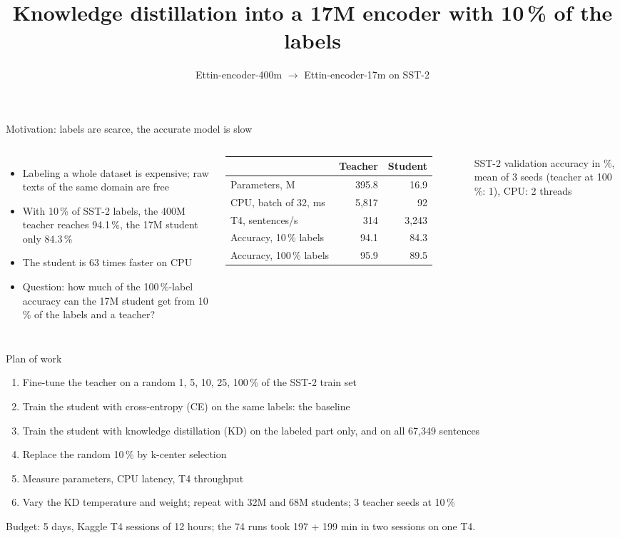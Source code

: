 \documentclass[aspectratio=169,11pt]{beamer}
\title{Knowledge distillation into a 17M encoder with 10\,\% of the labels}
\subtitle{Ettin-encoder-400m $\to$ Ettin-encoder-17m on SST-2}
\institute{Group project, Efficient Models course, ITMO 2026}
\date{}
\begin{document}
\begin{frame}
  \titlepage
\end{frame}

\begin{frame}{Motivation: labels are scarce, the accurate model is slow}
  \begin{columns}[T]
    \begin{itemize}
      \item Labeling a whole dataset is expensive; raw texts of the same domain are free
      \item With 10\,\% of SST-2 labels, the 400M teacher reaches 94.1\,\%, the 17M student only 84.3\,\%
      \item The student is 63 times faster on CPU
      \item Question: how much of the 100\,\%-label accuracy can the 17M student get from 10\,\% of the labels and a teacher?
    \end{itemize}
    \small
    \begin{tabular}{lrr}
      \toprule
      & Teacher & Student \\
      \midrule
      Parameters, M & 395.8 & 16.9 \\
      CPU, batch of 32, ms & 5,817 & 92 \\
      T4, sentences/s & 314 & 3,243 \\
      Accuracy, 10\,\% labels & 94.1 & 84.3 \\
      Accuracy, 100\,\% labels & 95.9 & 89.5 \\
      \bottomrule
    \end{tabular}

    \footnotesize SST-2 validation accuracy in \%, mean of 3 seeds (teacher at 100\,\%: 1), CPU: 2 threads
  \end{columns}
\end{frame}

\begin{frame}{Plan of work}
  \begin{enumerate}
    \item Fine-tune the teacher on a random 1, 5, 10, 25, 100\,\% of the SST-2 train set
    \item Train the student with cross-entropy (CE) on the same labels: the baseline
    \item Train the student with knowledge distillation (KD) on the labeled part only, and on all 67,349 sentences
    \item Replace the random 10\,\% by k-center selection
    \item Measure parameters, CPU latency, T4 throughput
    \item Vary the KD temperature and weight; repeat with 32M and 68M students; 3 teacher seeds at 10\,\%
  \end{enumerate}
  \medskip
  Budget: 5 days, Kaggle T4 sessions of 12 hours; the 74 runs took 197 + 199 min in two sessions on one T4.
\end{frame}
\end{document}
